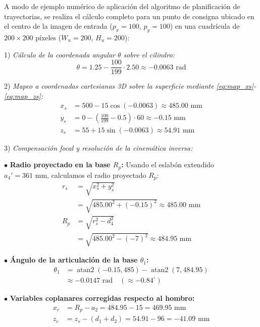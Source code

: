 \documentclass[conference,a4paper]{IEEEtran}
\begin{document}
A modo de ejemplo numérico de aplicación del algoritmo de planificación de trayectorias, se realiza el cálculo completo para un punto de consigna ubicado en el centro de la imagen de entrada ($p_x = 100$, $p_y = 100$) en una cuadrícula de $200 \times 200$ píxeles ($W_u = 200$, $H_u = 200$):

1) \textit{Cálculo de la coordenada angular $\theta$ sobre el cilindro:}
\begin{equation*}
\theta = 1.25 - \frac{100}{199} \cdot 2.50 \approx -0.0063\text{ rad}
\end{equation*}

2) \textit{Mapeo a coordenadas cartesianas 3D sobre la superficie mediante \eqref{eq:map_xs}-\eqref{eq:map_zs}:}
\begin{align*}
x_s &= 500 - 15 \cos(-0.0063) \approx 485.00\text{ mm} \\
y_s &= 0 - \left( \frac{100}{199} - 0.5 \right) \cdot 60 \approx -0.15\text{ mm} \\
z_s &= 55 + 15 \sin(-0.0063) \approx 54.91\text{ mm}
\end{align*}

3) \textit{Compensación focal y resolución de la cinemática inversa:}

\noindent $\bullet$ \textbf{Radio proyectado en la base $R_p$:} Usando el eslabón extendido $a_4' = 361\text{ mm}$, calculamos el radio proyectado $R_p$:
\begin{align*}
r_s &= \sqrt{x_s^2 + y_s^2} \\
&= \sqrt{485.00^2 + (-0.15)^2} \approx 485.00\text{ mm} \\
R_p &= \sqrt{r_s^2 - d_4^2} \\
&= \sqrt{485.00^2 - (-7)^2} \approx 484.95\text{ mm}
\end{align*}

\noindent $\bullet$ \textbf{Ángulo de la articulación de la base $\theta_1$:}
\begin{align*}
\theta_1 &= \operatorname{atan2}(-0.15, 485) - \operatorname{atan2}(7, 484.95) \\
&\approx -0.0147\text{ rad} \quad (\approx -0.84^\circ)
\end{align*}

\noindent $\bullet$ \textbf{Variables coplanares corregidas respecto al hombro:}
\begin{align*}
x_c &= R_p - a_2 = 484.95 - 15 = 469.95\text{ mm} \\
z_c &= z_s - (d_1 + d_2) = 54.91 - 96 = -41.09\text{ mm}
\end{align*}
\end{document}
